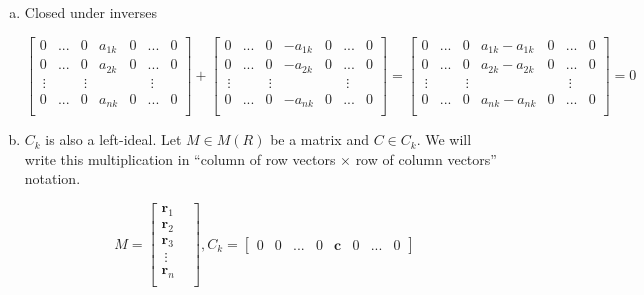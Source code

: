 \documentclass[11pt,oneside]{article}
\numberwithin{equation}{section}
\theoremstyle{definition}
\def\boldr{\boldsymbol{r}}
\def\boldc{\boldsymbol{c}}
\begin{document}
\begin{solution}
\begin{enumerate}[(a)]
      \item
    Closed under inverses

    \small
    \[
      \begin{bmatrix}
        0 & ... & 0 & a_{1k} & 0 & ... & 0 \\
        0 & ... & 0 & a_{2k} & 0 & ... & 0 \\
        \ \vdots & & \ \vdots  & & & \ \vdots \\
        0 & ... & 0 & a_{nk} & 0 & ... & 0 \\
      \end{bmatrix} + \begin{bmatrix}
        0 & ... & 0 & -a_{1k} & 0 & ... & 0 \\
        0 & ... & 0 & -a_{2k} & 0 & ... & 0 \\
        \ \vdots & & \ \vdots  & & & \ \vdots \\
        0 & ... & 0 & -a_{nk} & 0 & ... & 0 \\
      \end{bmatrix} = \begin{bmatrix} 
        0 & ... & 0 & a_{1k} - a _{1k}& 0 & ... & 0 \\
        0 & ... & 0 & a_{2k} - a_{2k}& 0 & ... & 0 \\
        \ \vdots & & \ \vdots  & & & \ \vdots \\
        0 & ... & 0 & a_{nk} - a_{nk}& 0 & ... & 0 \\
      \end{bmatrix} = 0
    \]
    \normalsize

\item
  $C_k$ is also a left-ideal.  Let $M \in M(R)$ be a matrix and $C \in C_k$.  We will
  write this multiplication in ``column of row vectors $\times$ row of column vectors'' notation.

  \[
  M = \begin{bmatrix}
    \boldr_1 & \\
    \boldr_2 & \\
    \boldr_3 & \\
    \ \vdots & \\
    \boldr_n & \\
  \end{bmatrix}, C_k = \begin{bmatrix}
    0 & 0 & ... & 0 & \boldc & 0 & ... & 0
  \end{bmatrix}
 \]


\end{enumerate}
\end{solution}
\end{document}
